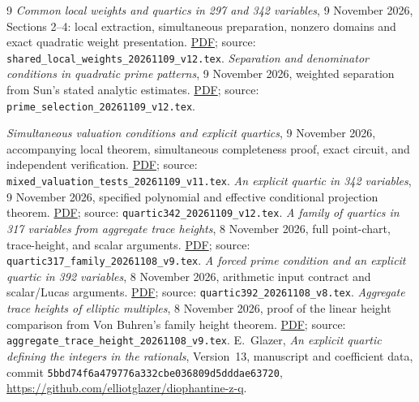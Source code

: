 \documentclass[11pt,a4paper]{article}
\theoremstyle{remark}\newtheorem{remark}[theorem]{Remark}
\begin{document}
\begingroup
\small
\begin{thebibliography}{9}
\emph{Common local weights and quartics in 297 and 342 variables},
9 November 2026, Sections 2--4: local extraction, simultaneous preparation,
nonzero domains and exact quadratic weight presentation.
\href{../local_tests/shared_local_weights_20261109_v12.pdf}{PDF};
source: \nolinkurl{shared_local_weights_20261109_v12.tex}.
\emph{Separation and denominator conditions in quadratic prime patterns},
9 November 2026, weighted separation from Sun's stated analytic estimates.
\href{../prime_selection/prime_selection_20261109_v12.pdf}{PDF};
source: \nolinkurl{prime_selection_20261109_v12.tex}.

\emph{Simultaneous valuation conditions and explicit quartics},
9 November 2026, accompanying local theorem, simultaneous completeness
proof, exact circuit, and independent verification.
\href{../local_tests/mixed_valuation_tests_20261109_v11.pdf}{PDF}; source: \nolinkurl{mixed_valuation_tests_20261109_v11.tex}.
\emph{An explicit quartic in 342 variables}, 9 November 2026,
specified polynomial and effective conditional projection theorem.
\href{../quartic/quartic342_20261109_v12.pdf}{PDF}; source: \nolinkurl{quartic342_20261109_v12.tex}.
\emph{A family of quartics in 317 variables from aggregate trace heights},
8 November 2026, full point-chart, trace-height, and scalar arguments.
\href{quartic317_family_20261108_v9.pdf}{PDF}; source: \nolinkurl{quartic317_family_20261108_v9.tex}.
\emph{A forced prime condition and an explicit quartic in 392 variables},
8 November 2026, arithmetic input contract and scalar/Lucas arguments.
\href{../quartic/quartic392_20261108_v8.pdf}{PDF}; source: \nolinkurl{quartic392_20261108_v8.tex}.
\emph{Aggregate trace heights of elliptic multiples},
8 November 2026, proof of the linear height comparison from Von Buhren's
family height theorem.
\href{../trace_heights/aggregate_trace_height_20261108_v9.pdf}{PDF}; source: \nolinkurl{aggregate_trace_height_20261108_v9.tex}.
E.~Glazer, \emph{An explicit quartic defining the integers in the rationals},
Version~13, manuscript and coefficient data, commit
\nolinkurl{5bbd74f6a479776a332cbe036809d5dddae63720},
\url{https://github.com/elliotglazer/diophantine-z-q}.
\end{thebibliography}
\endgroup
\end{document}
